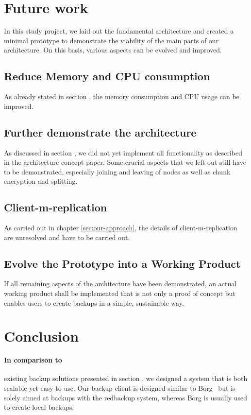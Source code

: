 \section{Future work}

In this study project, we laid out the fundamental architecture and created a minimal prototype to demonstrate the viability of the main parts of our architecture. On this basis, various aspects can be evolved and improved.

\subsection{Reduce Memory and CPU consumption}
As already stated in section , the memory consumption and CPU usage can be improved.

\subsection{Further demonstrate the architecture}

As discussed in section , we did not yet implement all functionality as described in the architecture concept paper. Some crucial aspects that we left out still have to be demonstrated, especially joining and leaving of nodes as well as chunk encryption and splitting.

\subsection{Client-m-replication}
As carried out in chapter \ref{sec:our-approach}, the details of \gls{client-m-replication} are unresolved and have to be carried out.

\subsection{Evolve the Prototype into a Working Product}
If all remaining aspects of the architecture have been demonstrated, an actual working product shall be implemented that is not only a proof of concept but enables users to create backups in a simple, sustainable way.

\section{Conclusion}
\paragraph{In comparison to}
existing backup solutions presented in section , we designed a system that is both scalable yet easy to use. Our backup \gls{client} is designed similar to Borg~\cite{borg-backup} but is solely aimed at backups with the redbackup system, whereas Borg is usually used to create local backups.

